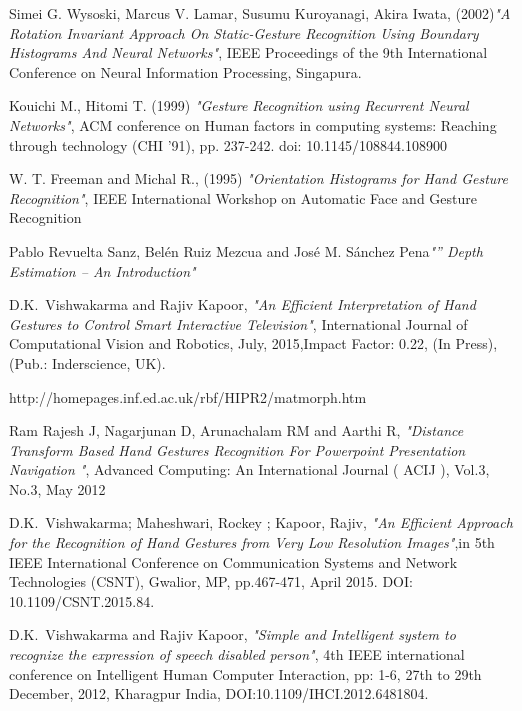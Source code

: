 \documentclass[conference]{IEEEtran}
\begin{document}
\begin{thebibliography}{1}

Simei G. Wysoski, Marcus V. Lamar, Susumu Kuroyanagi, Akira Iwata, (2002)\emph{"A Rotation
Invariant Approach On Static-Gesture Recognition Using Boundary Histograms And Neural Networks"}, IEEE Proceedings of the 9th International Conference on Neural Information
Processing, Singapura.

Kouichi M., Hitomi T. (1999) \emph{"Gesture Recognition using Recurrent Neural Networks"}, ACM
conference on Human factors in computing systems: Reaching through technology (CHI '91), pp.
237-242. doi: 10.1145/108844.108900

W. T. Freeman and Michal R., (1995) \emph{"Orientation Histograms for Hand Gesture Recognition"}, IEEE International Workshop on Automatic Face and Gesture Recognition

Pablo Revuelta Sanz, Belén Ruiz Mezcua and José M. Sánchez Pena\emph{"” Depth Estimation – An Introduction"}

D.K.~Vishwakarma and Rajiv Kapoor, \emph{"An Efficient Interpretation of Hand Gestures to Control Smart Interactive Television"}, International Journal of Computational Vision and Robotics, July, 2015,Impact Factor: 0.22, (In Press), (Pub.: Inderscience, UK).

http://homepages.inf.ed.ac.uk/rbf/HIPR2/matmorph.htm

Ram Rajesh J, Nagarjunan D, Arunachalam RM and Aarthi R, \emph{"Distance Transform Based Hand Gestures Recognition For Powerpoint Presentation Navigation "}, Advanced Computing: An International Journal ( ACIJ ), Vol.3, No.3, May 2012

D.K.~Vishwakarma; Maheshwari, Rockey ; Kapoor, Rajiv,  \emph{"An Efficient Approach for the Recognition of Hand Gestures from Very Low Resolution Images"},in 5th IEEE International Conference on Communication Systems and Network Technologies (CSNT), Gwalior, MP, pp.467-471, April 2015. DOI: 10.1109/CSNT.2015.84.


D.K.~Vishwakarma and Rajiv Kapoor, \emph{"Simple and Intelligent system to recognize the expression of speech disabled person"}, 4th IEEE international conference on Intelligent Human Computer Interaction, pp: 1-6, 27th to 29th December, 2012, Kharagpur India, DOI:10.1109/IHCI.2012.6481804.



\end{thebibliography}
\end{document}
